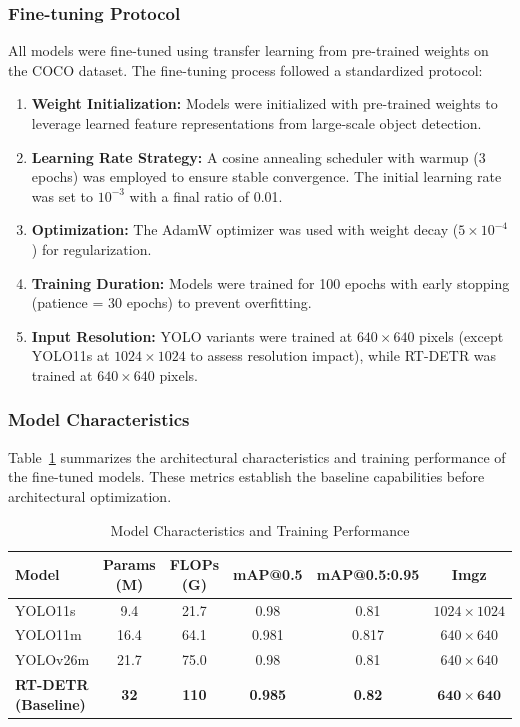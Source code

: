 \subsubsection{Fine-tuning Protocol}

All models were fine-tuned using transfer learning from pre-trained weights on the COCO dataset. The fine-tuning process followed a standardized protocol:

\begin{enumerate}
    \item \textbf{Weight Initialization:} Models were initialized with pre-trained weights to leverage learned feature representations from large-scale object detection.
    
    \item \textbf{Learning Rate Strategy:} A cosine annealing scheduler with warmup (3 epochs) was employed to ensure stable convergence. The initial learning rate was set to $10^{-3}$ with a final ratio of 0.01.
    
    \item \textbf{Optimization:} The AdamW optimizer was used with weight decay ($5 \times 10^{-4}$) for regularization.
    
    \item \textbf{Training Duration:} Models were trained for 100 epochs with early stopping (patience = 30 epochs) to prevent overfitting.
    
    \item \textbf{Input Resolution:} YOLO variants were trained at $640 \times 640$ pixels (except YOLO11s at $1024 \times 1024$ to assess resolution impact), while RT-DETR was trained at $640 \times 640$ pixels.
\end{enumerate}

\subsubsection{Model Characteristics}

Table~\ref{tab:model_characteristics} summarizes the architectural characteristics and training performance of the fine-tuned models. These metrics establish the baseline capabilities before architectural optimization.

\begin{table}[htbp]
\centering
\caption{Model Characteristics and Training Performance}
\label{tab:model_characteristics}
\begin{tabular}{@{}lccccc@{}}
\toprule
\textbf{Model} & \textbf{Params (M)} & \textbf{FLOPs (G)} & \textbf{mAP@0.5} & \textbf{mAP@0.5:0.95} & \textbf{Imgz} \\ \midrule
YOLO11s        & 9.4  & 21.7  & 0.98 & 0.81 & $1024 \times 1024$ \\
YOLO11m        & 16.4 & 64.1  & 0.981 & 0.817 & $640 \times 640$ \\
YOLOv26m       & 21.7 & 75.0  & 0.98 & 0.81 & $640 \times 640$ \\ \midrule
\textbf{RT-DETR (Baseline)} & \textbf{32} & \textbf{110} & \textbf{0.985} & \textbf{0.82} & $\mathbf{640 \times 640}$ \\ \bottomrule
\end{tabular}
\end{table}

